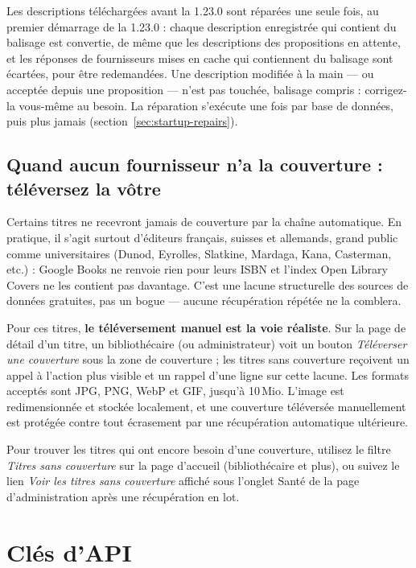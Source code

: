 Les descriptions téléchargées avant la 1.23.0 sont réparées une seule
fois, au premier démarrage de la 1.23.0 : chaque description
enregistrée qui contient du balisage est convertie, de même que les
descriptions des propositions en attente, et les réponses de
fournisseurs mises en cache qui contiennent du balisage sont écartées,
pour être redemandées. Une description modifiée à la main --- ou
acceptée depuis une proposition --- n'est pas touchée, balisage
compris : corrigez-la vous-même au besoin. La réparation s'exécute une
fois par base de données, puis plus jamais
(section~\ref{sec:startup-repairs}).

\subsection*{Quand aucun fournisseur n'a la couverture : téléversez la vôtre}

Certains titres ne recevront jamais de couverture par la chaîne
automatique. En pratique, il s'agit surtout d'éditeurs français,
suisses et allemands, grand public comme universitaires (Dunod,
Eyrolles, Slatkine, Mardaga, Kana, Casterman, etc.) : Google Books
ne renvoie rien pour leurs ISBN et l'index Open Library Covers ne
les contient pas davantage. C'est une lacune structurelle des
sources de données gratuites, pas un bogue --- aucune récupération
répétée ne la comblera.

Pour ces titres, \textbf{le téléversement manuel est la voie
réaliste}. Sur la page de détail d'un titre, un bibliothécaire (ou
administrateur) voit un bouton \emph{Téléverser une couverture} sous
la zone de couverture ; les titres sans couverture reçoivent un
appel à l'action plus visible et un rappel d'une ligne sur cette
lacune. Les formats acceptés sont JPG, PNG, WebP et GIF, jusqu'à
10\,Mio. L'image est redimensionnée et stockée localement, et une
couverture téléversée manuellement est protégée contre tout
écrasement par une récupération automatique ultérieure.

Pour trouver les titres qui ont encore besoin d'une couverture,
utilisez le filtre \emph{Titres sans couverture} sur la page
d'accueil (bibliothécaire et plus), ou suivez le lien \emph{Voir les
titres sans couverture} affiché sous l'onglet Santé de la page
d'administration après une récupération en lot.

\section{Clés d'API}

